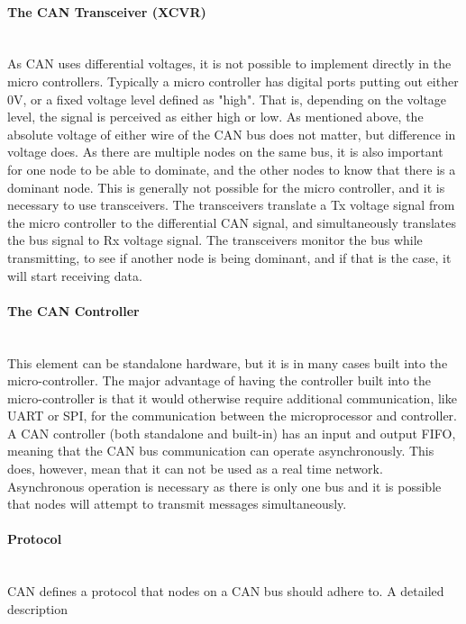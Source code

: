 \paragraph*{The CAN Transceiver (XCVR)}~\\
As CAN uses differential voltages, it is not possible to implement directly in the micro controllers.
Typically a micro controller has digital ports putting out either $ 0 \si{\volt}$, or a fixed voltage level defined as "high".
That is, depending on the voltage level, the signal is perceived as either high or low.
As mentioned above, the absolute voltage of either wire of the CAN bus does not matter, but difference in voltage does. 
As there are multiple nodes on the same bus, it is also important for one node to be able to dominate, and the other nodes to know that there is a dominant node.
This is generally not possible for the micro controller, and it is necessary to use transceivers.
The transceivers translate a Tx voltage signal from the micro controller to the differential CAN signal, and simultaneously translates the bus signal to Rx voltage signal.
The transceivers monitor the bus while transmitting, to see if another node is being dominant, and if that is the case, it will start receiving data.

\paragraph*{The CAN Controller}~\\
This element can be standalone hardware, but it is in many cases built into the micro-controller.
The major advantage of having the controller built into the micro-controller is that it would otherwise require additional communication, like UART or SPI, for the communication between the microprocessor and controller.
A CAN controller (both standalone and built-in) has an input and output FIFO, meaning that the CAN bus communication can operate asynchronously.
This does, however, mean that it can not be used as a real time network.
Asynchronous operation is necessary as there is only one bus and it is possible that nodes will attempt to transmit messages simultaneously.

\paragraph*{Protocol}~\\
CAN defines a protocol that nodes on a CAN bus should adhere to.
A detailed description

